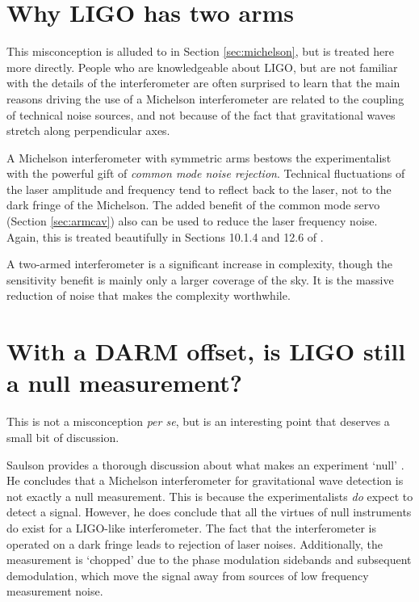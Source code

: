 \section{Why LIGO has two arms}
This misconception is alluded to in Section \ref{sec:michelson}, but is treated here more directly. %
People who are knowledgeable about LIGO, but are not familiar with the details of the interferometer are often surprised to learn that the main reasons driving the use of a Michelson interferometer are related to the coupling of technical noise sources, and not because of the fact that gravitational waves stretch along perpendicular axes.

A Michelson interferometer with symmetric arms bestows the experimentalist with the powerful gift of \emph{common mode noise rejection}. %
Technical fluctuations of the laser amplitude and frequency tend to reflect back to the laser, not to the dark fringe of the Michelson. %
The added benefit of the common mode servo (Section \ref{sec:armcav}) also can be used to reduce the laser frequency noise. %
Again, this is treated beautifully in Sections 10.1.4 and 12.6 of \citet{saulson1994fundamentals}. %


A two-armed interferometer is a significant increase in complexity, though the sensitivity benefit is mainly only a larger coverage of the sky. %
It is the massive reduction of noise that makes the complexity worthwhile.

\section{With a DARM offset, is LIGO still a null measurement?}
This is not a misconception {\it per se}, but is an interesting point that deserves a small bit of discussion.

Saulson provides a thorough discussion about what makes an experiment `null' \cite[Chapter 10]{saulson1994fundamentals}. %
He concludes that a Michelson interferometer for gravitational wave detection is not exactly a null measurement. %
This is because the experimentalists \emph{do} expect to detect a signal. %
However, he does conclude that all the virtues of null instruments do exist for a LIGO-like interferometer. %
The fact that the interferometer is operated on a dark fringe leads to rejection of laser noises. %
Additionally, the measurement is `chopped' due to the phase modulation sidebands and subsequent demodulation, which move the signal away from sources of low frequency measurement noise.

